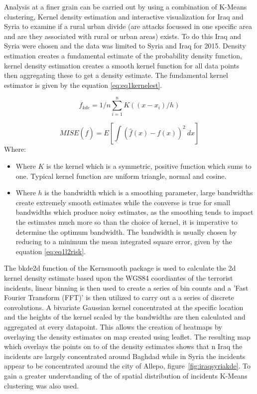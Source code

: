 Analysis at a finer grain can be carried out by using a combination of K-Means clustering, Kernel density estimation and interactive visualization for Iraq and Syria to examine if a rural urban divide (are attacks focussed in one specific area and are they associated with rural or urban areas) exists. To do this Iraq and Syria were chosen and the data was limited to Syria and Iraq for 2015. Density estimation creates a fundamental estimate of the probability density function, kernel density estimation creates a smooth kernel function for all data points then aggregating these to get a density estimate. The fundamental kernel estimator is given by the equation \ref{eq:eq1kernelest}.

\begin{equation} \hat{f}_{kde} = 1/n \sum^n_{i=1} K((x-x_i)/h) \label{eq:eq1kernelest}  \end{equation}

\begin{equation} MISE(\hat{f})=E[\int(\hat{f}(x)-f(x))^2 \ dx]
\label{eq:eq1l2risk}  \end{equation}
Where:
\begin{itemize}
\item[]  Where $K$ is the kernel which is a symmetric, positive function which sums to one. Typical kernel function are uniform triangle, normal and cosine.
\item[]  Where $h$ is the bandwidth which is a smoothing parameter, large bandwidths create extremely smooth estimates while the  converse is true for small bandwidths which produce noisy estimates, as the smoothing tends to impact the estimates much more so than the choice of kernel, it is imperative to determine the optimum bandwidth. The bandwidth is usually chosen by reducing to a minimum the mean integrated square error, given by the equation \ref{eq:eq1l2risk}.
\end{itemize}

The bkde2d function of the Kernsmooth package is used to calculate the 2d kernel density estimate based upon the WGS84 coordiantes of the terrorist incidents, linear binning is then used to create a series of bin counts and a 'Fast Fourier Transform (FFT)' is then utilized to carry out a a series of discrete convolutions. A bivariate Gaussian kernel concentrated at the specific location and the heights of the kernel scaled by the bandwidths are then calculated and aggregated at every datapoint. This allows the creation of heatmaps by overlaying the density estimates on map created using leaflet. The resulting map which overlays the points on to of the density estimates shows that n Iraq the incidents are largely concentrated around Baghdad while in Syria the incidents appear to be concentrated around the city of Allepo, figure~\ref{fig:iraqsyriakde}. To gain a greater understanding of the of spatial distribution of incidents K-Means clustering was also used.


